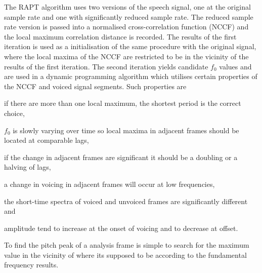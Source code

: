 The RAPT algorithm uses two versions of the speech signal, one at the original sample rate and one with significantly reduced sample rate. The reduced sample rate version is passed into a normalised cross-correlation function (NCCF) and the local maximum correlation distance is recorded. The results of the first iteration is used as a initialisation of the same procedure with the original signal, where the local maxima of the NCCF are restricted to be in the vicinity of the results of the first iteration. The second iteration yields candidate $f_0$ values and are used in a dynamic programming algorithm which utilises certain properties of the NCCF and voiced signal segments. Such properties are \begin{inparaenum} \item if there are more than one local maximum, the shortest period is the correct choice, \item $f_0$ is slowly varying over time so local maxima in adjacent frames should be located at comparable lags, \item if the change in adjacent frames are significant it should be a doubling or a halving of lags, \item a change in voicing in adjacent frames will occur at low frequencies, \item the short-time spectra of voiced and unvoiced frames are significantly different and \item amplitude tend to increase at the onset of voicing and to decrease at offset.\end{inparaenum}

To find the pitch peak of a analysis frame is simple to search for the maximum value in the vicinity of where its supposed to be according to the fundamental frequency results.


